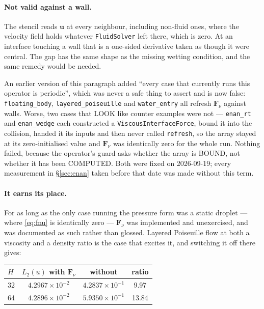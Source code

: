 \documentclass[11pt,a4paper]{article}
\newcommand{\code}[1]{\texttt{\small #1}}
\newcommand{\uu}{\bm{u}}
\newcommand{\e}[1]{\times 10^{#1}}
\begin{document}
\paragraph{Not valid against a wall.} The stencil reads $\uu$ at every neighbour,
including non-fluid ones, where the velocity field holds whatever
\code{FluidSolver} left there, which is zero. At an interface touching a wall
that is a one-sided derivative taken as though it were central. The gap has the
same shape as the missing wetting condition, and the same remedy would be needed.

An earlier version of this paragraph added ``every case that currently runs this
operator is periodic'', which was never a safe thing to assert and is now false:
\code{floating\_body}, \code{layered\_poiseuille} and \code{water\_entry} all
refresh $\bm{F}_\nu$ against walls. Worse, two cases that LOOK like counter\-
examples were not --- \code{enan\_rt} and \code{enan\_wedge} each constructed a
\code{ViscousInterfaceForce}, bound it into the collision, handed it its inputs
and then never called \code{refresh}, so the array stayed at its zero-initialised
value and $\bm{F}_\nu$ was identically zero for the whole run. Nothing failed,
because the operator's guard asks whether the array is BOUND, not whether it has
been COMPUTED. Both were fixed on 2026-09-19; every measurement in
\S\ref{sec:enan} taken before that date was made without this term.

\paragraph{It earns its place.} For as long as the only case running the pressure
form was a static droplet --- where \eqref{eq:fnu} is identically zero ---
$\bm{F}_\nu$ was implemented and unexercised, and was documented as such rather
than glossed. Layered Poiseuille flow at both a viscosity and a density ratio is
the case that excites it, and switching it off there gives:

\begin{center}\small
\begin{tabular}{lccc}
\toprule
$H$ & $L_2(u)$ with $\bm{F}_\nu$ & without & ratio \\
\midrule
32 & $4.2967\e{-2}$ & $4.2837\e{-1}$ & 9.97 \\
64 & $4.2896\e{-2}$ & $5.9350\e{-1}$ & 13.84 \\
\bottomrule
\end{tabular}
\end{center}
\end{document}
